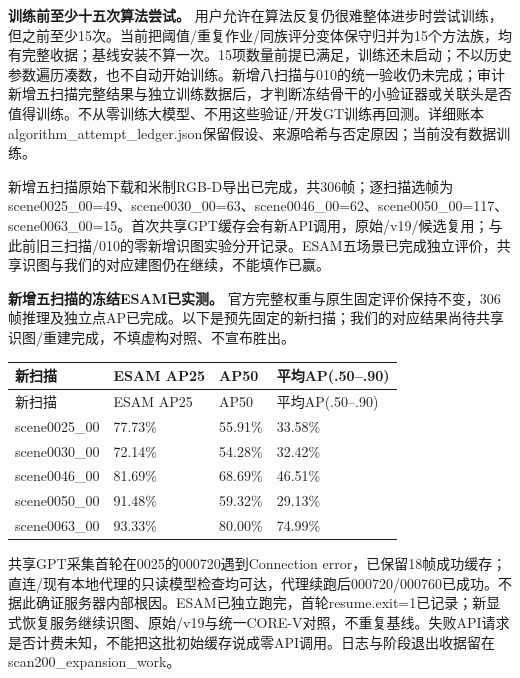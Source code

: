 \documentclass[UTF8,fontset=fandol]{ctexart}
\begin{document}
\textbf{训练前至少十五次算法尝试。} 用户允许在算法反复仍很难整体进步时尝试训练，但之前至少15次。当前把阈值/重复作业/同族评分变体保守归并为15个方法族，均有完整收据；基线安装不算一次。15项数量前提已满足，训练还未启动；不以历史参数遍历凑数，也不自动开始训练。新增八扫描与010的统一验收仍未完成；审计新增五扫描完整结果与独立训练数据后，才判断冻结骨干的小验证器或关联头是否值得训练。不从零训练大模型、不用这些验证/开发GT训练再回测。详细账本algorithm\_attempt\_ledger.json保留假设、来源哈希与否定原因；当前没有数据训练。



新增五扫描原始下载和米制RGB-D导出已完成，共306帧；逐扫描选帧为scene0025\_00=49、scene0030\_00=63、scene0046\_00=62、scene0050\_00=117、scene0063\_00=15。首次共享GPT缓存会有新API调用，原始/v19/候选复用；与此前旧三扫描/010的零新增识图实验分开记录。ESAM五场景已完成独立评价，共享识图与我们的对应建图仍在继续，不能填作已赢。



\textbf{新增五扫描的冻结ESAM已实测。} 官方完整权重与原生固定评价保持不变，306帧推理及独立点AP已完成。以下是预先固定的新扫描；我们的对应结果尚待共享识图/重建完成，不填虚构对照、不宣布胜出。



{\small
\begin{longtable}{|p{}|p{}|p{}|p{}|}
\hline
新扫描 & ESAM AP25 & AP50 & 平均AP(.50–.90) \\ \hline
\endfirsthead
\hline
新扫描 & ESAM AP25 & AP50 & 平均AP(.50–.90) \\ \hline
\endhead
scene0025\_00 & 77.73\% & 55.91\% & 33.58\% \\ \hline
scene0030\_00 & 72.14\% & 54.28\% & 32.42\% \\ \hline
scene0046\_00 & 81.69\% & 68.69\% & 46.51\% \\ \hline
scene0050\_00 & 91.48\% & 59.32\% & 29.13\% \\ \hline
scene0063\_00 & 93.33\% & 80.00\% & 74.99\% \\ \hline
\end{longtable}
}

共享GPT采集首轮在0025的000720遇到Connection error，已保留18帧成功缓存；直连/现有本地代理的只读模型检查均可达，代理续跑后000720/000760已成功。不据此确证服务器内部根因。ESAM已独立跑完，首轮resume.exit=1已记录；新显式恢复服务继续识图、原始/v19与统一CORE-V对照，不重复基线。失败API请求是否计费未知，不能把这批初始缓存说成零API调用。日志与阶段退出收据留在scan200\_expansion\_work。
\end{document}
